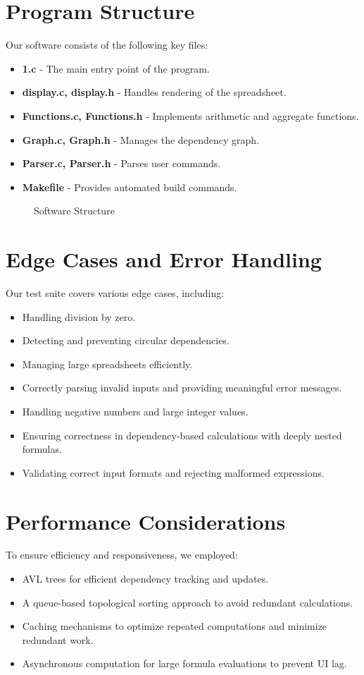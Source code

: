 \documentclass{article}
\begin{document}
\section{Program Structure}
Our software consists of the following key files:
\begin{itemize}
    \item \textbf{1.c} - The main entry point of the program.
    \item \textbf{display.c, display.h} - Handles rendering of the spreadsheet.
    \item \textbf{Functions.c, Functions.h} - Implements arithmetic and aggregate functions.
    \item \textbf{Graph.c, Graph.h} - Manages the dependency graph.
    \item \textbf{Parser.c, Parser.h} - Parses user commands.
    \item \textbf{Makefile} - Provides automated build commands.
\end{itemize}

\begin{figure}[h]
    \centering
    
    \caption{Software Structure}
    \label{fig:diagram}
\end{figure}

\section{Edge Cases and Error Handling}
Our test suite covers various edge cases, including:
\begin{itemize}
    \item Handling division by zero.
    \item Detecting and preventing circular dependencies.
    \item Managing large spreadsheets efficiently.
    \item Correctly parsing invalid inputs and providing meaningful error messages.
    \item Handling negative numbers and large integer values.
    \item Ensuring correctness in dependency-based calculations with deeply nested formulas.
    \item Validating correct input formats and rejecting malformed expressions.
\end{itemize}

\section{Performance Considerations}
To ensure efficiency and responsiveness, we employed:
\begin{itemize}
    \item AVL trees for efficient dependency tracking and updates.
    \item A queue-based topological sorting approach to avoid redundant calculations.
    \item Caching mechanisms to optimize repeated computations and minimize redundant work.
    \item Asynchronous computation for large formula evaluations to prevent UI lag.
\end{itemize}
\end{document}
